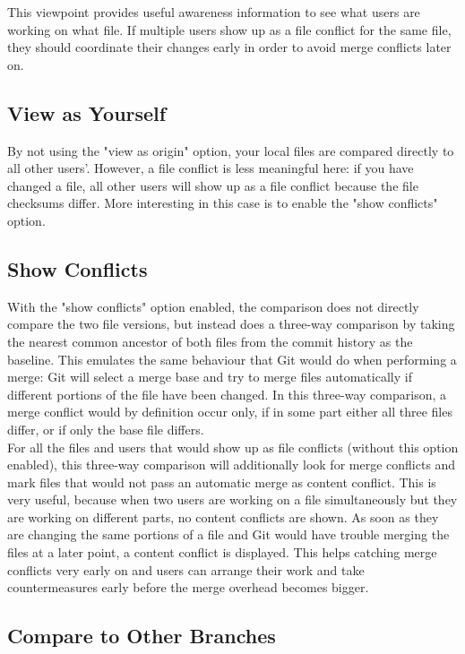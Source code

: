 This viewpoint provides useful awareness information to see what users are working on what file. If multiple users show up as a file conflict for the same file, they should coordinate their changes early in order to avoid merge conflicts later on.

\subsection{View as Yourself}

By not using the "view as origin" option, your local files are compared directly to all other users'. However, a file conflict is less meaningful here: if you have changed a file, all other users will show up as a file conflict because the file checksums differ. More interesting in this case is to enable the "show conflicts" option.

\subsection{Show Conflicts}

With the "show conflicts" option enabled, the comparison does not directly compare the two file versions, but instead does a three-way comparison by taking the nearest common ancestor of both files from the commit history as the baseline. This emulates the same behaviour that Git would do when performing a merge: Git will select a merge base and try to merge files automatically if different portions of the file have been changed. In this three-way comparison, a merge conflict would by definition occur only, if in some part either all three files differ, or if only the base file differs. \\

For all the files and users that would show up as file conflicts (without this option enabled), this three-way comparison will additionally look for merge conflicts and mark files that would not pass an automatic merge as content conflict. This is very useful, because when two users are working on a file simultaneously but they are working on different parts, no content conflicts are shown. As soon as they are changing the same portions of a file and Git would have trouble merging the files at a later point, a content conflict is displayed. This helps catching merge conflicts very early on and users can arrange their work and take countermeasures early before the merge overhead becomes bigger.

\subsection{Compare to Other Branches}

